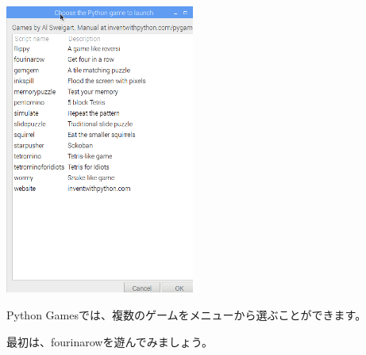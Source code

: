 \documentclass[a4paper,dvipdfmx]{jarticle}
\begin{document}
\bigskip


\bigskip


\bigskip


\bigskip


\bigskip


\bigskip


\bigskip



\begin{center}
\includegraphics[width=6.207cm,height=9.562cm]{text02-img/text02-img018.png}

\end{center}

\bigskip


\bigskip


\bigskip


\bigskip


\bigskip


\bigskip


\bigskip


\bigskip


\bigskip


\bigskip


\bigskip


\bigskip


\bigskip


\bigskip

Python
Gamesでは、複数のゲームをメニューから選ぶことができます。

最初は、fourinarowを遊んでみましょう。


\bigskip


\bigskip
\end{document}
